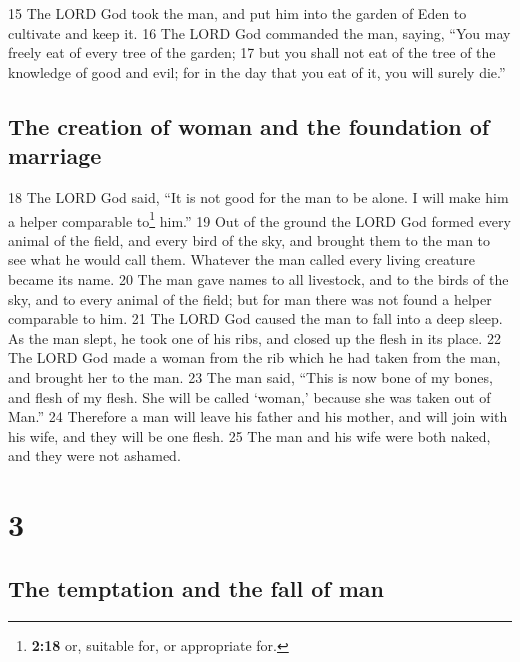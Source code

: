 {15} The LORD God took the man, and put him into the garden of Eden to
cultivate and keep it. {16} The LORD God commanded the man, saying,
``You may freely eat of every tree of the garden; {17} but you shall not
eat of the tree of the knowledge of good and evil; for in the day that
you eat of it, you will surely die.''

\hypertarget{the-creation-of-woman-and-the-foundation-of-marriage}{%
\subsection{The creation of woman and the foundation of
marriage}\label{the-creation-of-woman-and-the-foundation-of-marriage}}

{18} The LORD God said, ``It is not good for the man to be alone. I will
make him a helper comparable to\footnote{\textbf{2:18} or, suitable for,
  or appropriate for.} him.'' {19} Out of the ground the LORD God formed
every animal of the field, and every bird of the sky, and brought them
to the man to see what he would call them. Whatever the man called every
living creature became its name. {20} The man gave names to all
livestock, and to the birds of the sky, and to every animal of the
field; but for man there was not found a helper comparable to him. {21}
The LORD God caused the man to fall into a deep sleep. As the man slept,
he took one of his ribs, and closed up the flesh in its place. {22} The
LORD God made a woman from the rib which he had taken from the man, and
brought her to the man. {23} The man said, ``This is now bone of my
bones, and flesh of my flesh. She will be called `woman,' because she
was taken out of Man.'' {24} Therefore a man will leave his father and
his mother, and will join with his wife, and they will be one flesh.
{25} The man and his wife were both naked, and they were not ashamed.

\hypertarget{section-2}{%
\section{3}\label{section-2}}

\hypertarget{the-temptation-and-the-fall-of-man}{%
\subsection{The temptation and the fall of
man}\label{the-temptation-and-the-fall-of-man}}

